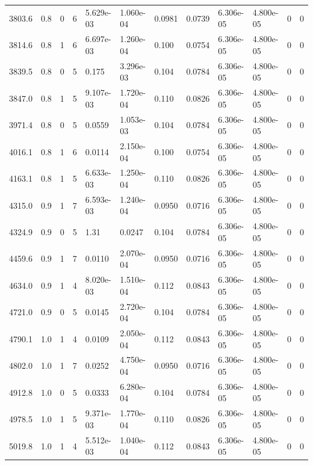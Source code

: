 \documentclass[preview]{standalone}
\begin{document}
{{{\begin{tabular}{L{1.2cm}C{1.2cm} C{0.3cm}C{0.5cm} C{1.4cm}C{1.4cm} C{1.4cm}C{1.4cm} C{1.6cm}C{1.6cm} C{1.6cm}C{1.6cm}}
  3803.6  &   0.8  & 0     &  6 &  5.629e-03  & 1.060e-04  &  0.0981&   0.0739& 6.306e-05 & 4.800e-05   &  0 & 0  \\ 
  3814.6  &   0.8  & 1     &  6 &  6.697e-03  & 1.260e-04  &  0.100&   0.0754& 6.306e-05 & 4.800e-05   &  0 & 0  \\ 
  3839.5  &   0.8  & 0     &  5 &  0.175  & 3.296e-03  &  0.104&   0.0784& 6.306e-05 & 4.800e-05   &  0 & 0  \\ 
  3847.0  &   0.8  & 1     &  5 &  9.107e-03  & 1.720e-04  &  0.110&   0.0826& 6.306e-05 & 4.800e-05   &  0 & 0  \\ 
  3971.4  &   0.8  & 0     &  5 &  0.0559  & 1.053e-03  &  0.104&   0.0784& 6.306e-05 & 4.800e-05   &  0 & 0  \\ 
  4016.1  &   0.8  & 1     &  6 &  0.0114  & 2.150e-04  &  0.100&   0.0754& 6.306e-05 & 4.800e-05   &  0 & 0  \\ 
  4163.1  &   0.8  & 1     &  5 &  6.633e-03  & 1.250e-04  &  0.110&   0.0826& 6.306e-05 & 4.800e-05   &  0 & 0  \\ 
  4315.0  &   0.9  & 1     &  7 &  6.593e-03  & 1.240e-04  &  0.0950&   0.0716& 6.306e-05 & 4.800e-05   &  0 & 0  \\ 
  4324.9  &   0.9  & 0     &  5 &  1.31  & 0.0247  &  0.104&   0.0784& 6.306e-05 & 4.800e-05   &  0 & 0  \\ 
  4459.6  &   0.9  & 1     &  7 &  0.0110  & 2.070e-04  &  0.0950&   0.0716& 6.306e-05 & 4.800e-05   &  0 & 0  \\ 
  4634.0  &   0.9  & 1     &  4 &  8.020e-03  & 1.510e-04  &  0.112&   0.0843& 6.306e-05 & 4.800e-05   &  0 & 0  \\ 
  4721.0  &   0.9  & 0     &  5 &  0.0145  & 2.720e-04  &  0.104&   0.0784& 6.306e-05 & 4.800e-05   &  0 & 0  \\ 
  4790.1  &   1.0  & 1     &  4 &  0.0109  & 2.050e-04  &  0.112&   0.0843& 6.306e-05 & 4.800e-05   &  0 & 0  \\ 
  4802.0  &   1.0  & 1     &  7 &  0.0252  & 4.750e-04  &  0.0950&   0.0716& 6.306e-05 & 4.800e-05   &  0 & 0  \\ 
  4912.8  &   1.0  & 0     &  5 &  0.0333  & 6.280e-04  &  0.104&   0.0784& 6.306e-05 & 4.800e-05   &  0 & 0  \\ 
  4978.5  &   1.0  & 1     &  5 &  9.371e-03  & 1.770e-04  &  0.110&   0.0826& 6.306e-05 & 4.800e-05   &  0 & 0  \\ 
  5019.8  &   1.0  & 1     &  4 &  5.512e-03  & 1.040e-04  &  0.112&   0.0843& 6.306e-05 & 4.800e-05   &  0 & 0  \\ 

\end{tabular}}}}
\end{document}
